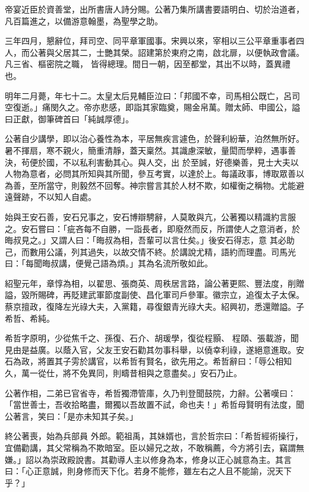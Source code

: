 \begin{pinyinscope}
 帝宴近臣於資善堂，出所書唐人詩分賜。公著乃集所講書要語明白、切於治道者，凡百篇進之，以備游意翰墨，為聖學之助。



 三年四月，懇辭位，拜司空、同平章軍國事。宋興以來，宰相以三公平章重事者四人，而公著與父居其二，士艷其榮。詔建第於東府之南，啟北扉，以便執政會議。凡三省、樞密院之職，
 皆得總理。間日一朝，因至都堂，其出不以時，蓋異禮也。



 明年二月薨，年七十二。太皇太后見輔臣泣曰：「邦國不幸，司馬相公既亡，呂司空復逝。」痛閔久之。帝亦悲感，即詣其家臨奠，賜金帛萬。贈太師、申國公，謚曰正獻，御筆碑首曰「純誠厚德」。



 公著自少講學，即以治心養性為本，平居無疾言遽色，於聲利紛華，泊然無所好。暑不揮扇，寒不親火，簡重清靜，蓋天稟然。其識慮深敏，量閎而學粹，遇事善決，茍便於國，不以私利害動其心。與人交，出
 於至誠，好德樂善，見士大夫以人物為意者，必問其所知與其所聞，參互考實，以達於上。每議政事，博取眾善以為善，至所當守，則毅然不回奪。神宗嘗言其於人材不欺，如權衡之稱物。尤能避遠聲跡，不以知人自處。



 始與王安石善，安石兄事之，安石博辯騁辭，人莫敢與亢，公著獨以精識約言服之。安石嘗曰：「疵吝每不自勝，一詣長者，即廢然而反，所謂使人之意消者，於晦叔見之。」又謂人曰：「晦叔為相，吾輩可以言仕矣。」後安石得志，意
 其必助己，而數用公議，列其過失，以故交情不終。於講說尤精，語約而理盡。司馬光曰：「每聞晦叔講，便覺己語為煩。」其為名流所敬如此。



 紹聖元年，章惇為相，以翟思、張商英、周秩居言路，論公著更熙、豐法度，削贈謚，毀所賜碑，再貶建武軍節度副使、昌化軍司戶參軍。徽宗立，追復太子太保。蔡京擅政，復降左光祿大夫，入黨籍，尋復銀青光祿大夫。紹興初，悉還贈謚。子希哲、希純。



 希哲字原明，少從焦千之、孫復、石介、胡瑗學，復從程顥、
 程頤、張載游，聞見由是益廣。以蔭入官，父友王安石勸其勿事科舉，以僥幸利祿，遂絕意進取。安石為政，將置其子雱於講官，以希哲有賢名，欲先用之。希哲辭曰：「辱公相知久，萬一從仕，將不免異同，則疇昔相與之意盡矣。」安石乃止。



 公著作相，二弟已官省寺，希哲獨滯管庫，久乃判登聞鼓院，力辭。公著嘆曰：「當世善士，吾收拾略盡，爾獨以吾故置不試，命也夫！」希哲母賢明有法度，聞公著言，笑曰：「是亦未知其子矣。」



 終公著喪，始為兵部員
 外郎。範祖禹，其妹婿也，言於哲宗曰：「希哲經術操行，宜備勸講，其父常稱為不欺暗室。臣以婦兄之故，不敢稱薦，今方將引去，竊謂無嫌。」詔以為崇政殿說書。其勸導人主以修身為本，修身以正心誠意為主。其言曰：「心正意誠，則身修而天下化。若身不能修，雖左右之人且不能諭，況天下乎？」




\end{pinyinscope}
